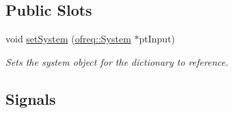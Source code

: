 \subsection*{Public Slots}
\begin{DoxyCompactItemize}
\item 
void \hyperlink{classosea_1_1_file_reader_a54b42892f8c4de66ad1f7bfd1e8e0a27}{set\-System} (\hyperlink{classosea_1_1ofreq_1_1_system}{ofreq\-::\-System} $\ast$pt\-Input)
\begin{DoxyCompactList}\small\item\em Sets the system object for the dictionary to reference. \end{DoxyCompactList}\end{DoxyCompactItemize}
\subsection*{Signals}
